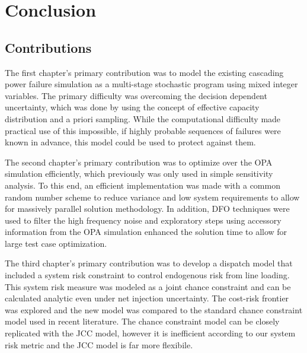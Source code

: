 
\chapter{Conclusion}
\section{Contributions}
The first chapter's primary contribution was to model the existing cascading power failure simulation as a multi-stage stochastic program using mixed integer variables.  The primary difficulty was overcoming the decision dependent uncertainty, which was done by using the concept of effective capacity distribution and a priori sampling.  While the computational difficulty made practical use of this impossible, if highly probable sequences of failures were known in advance, this model could be used to protect against them.

The second chapter's primary contribution was to optimize over the OPA simulation efficiently, which previously was only used in simple sensitivity analysis.  To this end, an efficient implementation was made with a common random number scheme to reduce variance and low system requirements to allow for massively parallel solution methodology.  In addition, DFO techniques were used to filter the high frequency noise and exploratory steps using accessory information from the OPA simulation enhanced the solution time to allow for large test case optimization.

The third chapter's primary contribution was to develop a dispatch model that included a system risk constraint to control endogenous risk from line loading.  This system risk measure was modeled as a joint chance constraint and can be calculated analytic even under net injection uncertainty.  The cost-risk frontier was explored and the new model was compared to the standard chance constraint model used in recent literature.  The chance constraint model can be closely replicated with the JCC model, however it is inefficient according to our system risk metric and the JCC model is far more flexibile.

